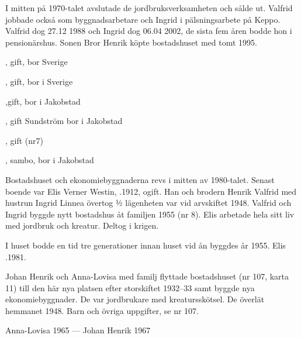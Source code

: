 I mitten på 1970-talet avslutade de jordbruksverksamheten och sålde ut. Valfrid jobbade också som byggnadsarbetare och Ingrid i pälsningsarbete på Keppo. Valfrid dog 27.12 1988 och Ingrid dog 06.04 2002, de sista fem åren bodde hon i  pensionärshus. Sonen Bror Henrik köpte bostadshuset med tomt 1995.
\begin{jhchildren}
  \item {}, gift, bor Sverige
  \item {}, gift, bor i Sverige
  \item {},gift, bor i Jakobstad
  \item {}, gift Sundström bor i Jakobstad
  \item {}, gift (nr7)
  \item {}, sambo, bor i Jakobstad
\end{jhchildren}






Bostadshuset och ekonomiebyggnaderna revs i mitten av 1980-talet. Senast boende var Elis Verner Westin, .1912, ogift. Han och brodern Henrik Valfrid med hustrun Ingrid Linnea övertog ½ lägenheten var vid arvskiftet 1948. Valfrid och Ingrid byggde nytt bostadshus åt familjen 1955 (nr 8). Elis arbetade hela sitt liv med jordbruk och kreatur. Deltog i krigen.

I huset bodde en tid tre generationer innan huset vid ån byggdes år 1955. Elis .1981.


Johan Henrik och Anna-Lovisa med familj flyttade bostadshuset (nr 107, karta 11) till den här nya platsen efter storskiftet 1932--33 samt byggde nya ekonomiebyggnader. De var jordbrukare med kreatursskötsel. De överlät hemmanet 1948. Barn och övriga uppgifter, se nr 107.

Anna-Lovisa  1965  ---  Johan Henrik  1967



